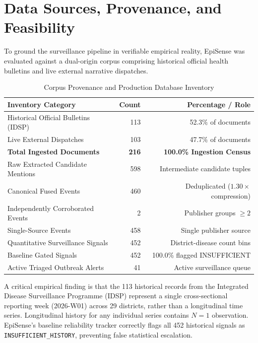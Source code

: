 \documentclass[conference]{IEEEtran}
\begin{document}
\section{Data Sources, Provenance, and Feasibility}
To ground the surveillance pipeline in verifiable empirical reality, EpiSense was evaluated against a dual-origin corpus comprising historical official health bulletins and live external narrative dispatches.

\begin{table}[htbp]
\caption{Corpus Provenance and Production Database Inventory}
\label{tab:corpus}
\begin{center}
\begin{tabular}{lrr}
\toprule
\textbf{Inventory Category} & \textbf{Count} & \textbf{Percentage / Role} \\
\midrule
Historical Official Bulletins (IDSP) & 113 & 52.3\% of documents \\
Live External Dispatches & 103 & 47.7\% of documents \\
\textbf{Total Ingested Documents} & \textbf{216} & \textbf{100.0\% Ingestion Census} \\
\addlinespace
Raw Extracted Candidate Mentions & 598 & Intermediate candidate tuples \\
Canonical Fused Events & 460 & Deduplicated ($1.30\times$ compression) \\
Independently Corroborated Events & 2 & Publisher groups $\ge 2$ \\
Single-Source Events & 458 & Single publisher source \\
\addlinespace
Quantitative Surveillance Signals & 452 & District-disease count bins \\
Baseline Gated Signals & 452 & 100.0\% flagged INSUFFICIENT \\
Active Triaged Outbreak Alerts & 41 & Active surveillance queue \\
\bottomrule
\end{tabular}
\end{center}
\end{table}

A critical empirical finding is that the 113 historical records from the Integrated Disease Surveillance Programme (IDSP) represent a single cross-sectional reporting week (2026-W01) across 29 districts, rather than a longitudinal time series. Longitudinal history for any individual series contains $N=1$ observation. EpiSense's baseline reliability tracker correctly flags all 452 historical signals as \texttt{INSUFFICIENT\_HISTORY}, preventing false statistical escalation.
\end{document}
